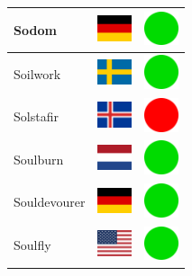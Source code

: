\documentclass[12pt, a4paper, twoside]{report}
\begin{document}
\begin{center}
\begin{longtable}{|p{5cm}|p{2cm}|p{2cm}|}
			Sodom & \includegraphics[width=1cm]{4x3/de} & \includegraphics[width=1cm]{likes/y} \\ \hline
			Soilwork & \includegraphics[width=1cm]{4x3/se} & \includegraphics[width=1cm]{likes/y} \\ \hline
			Solstafir & \includegraphics[width=1cm]{4x3/is} & \includegraphics[width=1cm]{likes/n} \\ \hline
			Soulburn & \includegraphics[width=1cm]{4x3/nl} & \includegraphics[width=1cm]{likes/y} \\ \hline
			Souldevourer & \includegraphics[width=1cm]{4x3/de} & \includegraphics[width=1cm]{likes/y} \\ \hline
			Soulfly & \includegraphics[width=1cm]{4x3/us} & \includegraphics[width=1cm]{likes/y} \\ \hline

\end{longtable}
\end{center}
\end{document}
